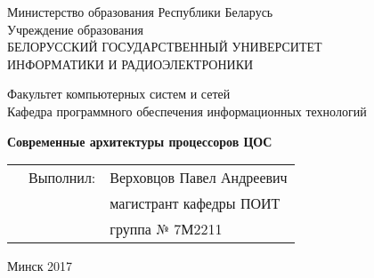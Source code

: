 \begin{titlepage}
  \begin{center}
    Министерство образования Республики Беларусь\\[1em]
    Учреждение образования\\
    БЕЛОРУССКИЙ ГОСУДАРСТВЕННЫЙ УНИВЕРСИТЕТ \\
    ИНФОРМАТИКИ И РАДИОЭЛЕКТРОНИКИ\\[1em]

    \begin{flushleft}
        Факультет компьютерных систем и сетей\\
        Кафедра программного обеспечения информационных технологий
    \end{flushleft}

    \textbf{Современные архитектуры процессоров ЦОС}\\[1em]

    \vspace{0.5\textheight}

    \begin{tabular}{ p{}p{} p{}}
      & Выполнил: & Верховцов Павел Андреевич \\
      & & магистрант кафедры ПОИТ \\
      & & группа № 7М2211\\
    \end{tabular}

\vfill    
    {\normalsize Минск 2017}
  \end{center}
\end{titlepage}
